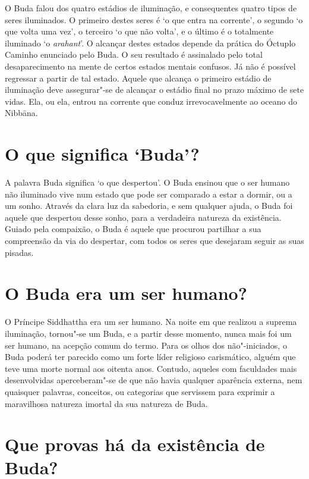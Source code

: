 O Buda falou dos quatro estádios de iluminação, e consequentes quatro
tipos de seres iluminados. O primeiro destes seres é `o que entra na
corrente', o segundo `o que volta uma vez', o terceiro `o que não
volta', e o último é o totalmente iluminado `o \emph{arahant}'. O
alcançar destes estados depende da prática do Óctuplo Caminho enunciado
pelo Buda. O seu resultado é assinalado pelo total desaparecimento na
mente de certos estados mentais confusos. Já não é possível regressar a
partir de tal estado. Aquele que alcança o primeiro estádio de
iluminação deve assegurar"-se de alcançar o estádio final no prazo máximo
de sete vidas. Ela, ou ela, entrou na corrente que conduz
irrevocavelmente ao oceano do Nibbāna.

\section{O que significa `Buda'?}

A palavra Buda significa `o que despertou'. O Buda ensinou que o ser
humano não iluminado vive num estado que pode ser comparado a estar a
dormir, ou a um sonho. Através da clara luz da sabedoria, e sem qualquer
ajuda, o Buda foi aquele que despertou desse sonho, para a verdadeira
natureza da existência. Guiado pela compaixão, o Buda é aquele que
procurou partilhar a sua compreensão da via do despertar, com todos os
seres que desejaram seguir as suas pisadas.

\section{O Buda era um ser humano?}

O Príncipe Siddhattha era um ser humano. Na noite em que realizou a
suprema iluminação, tornou"-se um Buda, e a partir desse momento, nunca
mais foi um ser humano, na acepção comum do termo. Para os olhos dos
não"-iniciados, o Buda poderá ter parecido como um forte líder religioso
carismático, alguém que teve uma morte normal aos oitenta anos. Contudo,
aqueles com faculdades mais desenvolvidas aperceberam"-se de que não
havia qualquer aparência externa, nem quaisquer palavras, conceitos, ou
categorias que servissem para \mbox{exprimir} a maravilhosa natureza imortal da
sua natureza de Buda.

\section{Que provas há da existência de Buda?}

